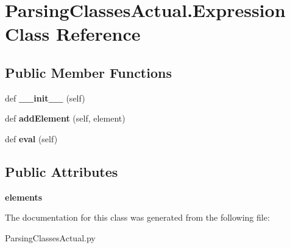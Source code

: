 \hypertarget{class_parsing_classes_actual_1_1_expression}{}\section{Parsing\+Classes\+Actual.\+Expression Class Reference}
\label{class_parsing_classes_actual_1_1_expression}
\subsection*{Public Member Functions}
\begin{DoxyCompactItemize}
\item 
\mbox{\label{class_parsing_classes_actual_1_1_expression_a76e27ac0110d45f2943ed2a48b0ec379}} 
def {\bfseries \+\_\+\+\_\+init\+\_\+\+\_\+} (self)
\item 
\mbox{\label{class_parsing_classes_actual_1_1_expression_acfc7f3fdfc30916c3684f29994c51e53}} 
def {\bfseries add\+Element} (self, element)
\item 
\mbox{\label{class_parsing_classes_actual_1_1_expression_a3a22e0b9d00beb8eb7fa40cfb45db6ed}} 
def {\bfseries eval} (self)
\end{DoxyCompactItemize}
\subsection*{Public Attributes}
\begin{DoxyCompactItemize}
\item 
\mbox{\label{class_parsing_classes_actual_1_1_expression_a41891da0f782b121512065f8bbcf7c1b}} 
{\bfseries elements}
\end{DoxyCompactItemize}


The documentation for this class was generated from the following file\+:\begin{DoxyCompactItemize}
\item 
Parsing\+Classes\+Actual.\+py\end{DoxyCompactItemize}
